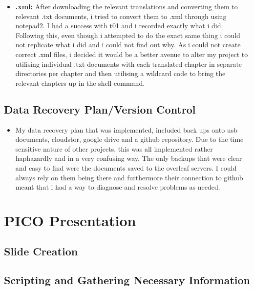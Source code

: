\documentclass{article}
\begin{document}
\begin{itemize}
    \item{\textbf{.xml:} After downloading the relevant translations and converting them to relevant .txt documents, i tried to convert them to .xml through using notepad2. I had a success with t01 and i recorded exactly what i did. Following this, even though i attempted to do the exact same thing i could not replicate what i did and i could not find out why. As i could not create correct .xml files, i decided it would be a better avenue to alter my project to utilising individual .txt documents with each translated chapter in separate directories per chapter and then utilising a wildcard code to bring the relevant chapters up in the shell command.}
    
   
\end{itemize}



\subsection{Data Recovery Plan/Version Control}

\begin{itemize}
\item{My data recovery plan that was implemented, included back ups onto usb documents, cloudstor, google drive and a github repository. Due to the time sensitive nature of other projects, this was all implemented rather haphazardly and in a very confusing way. The only backups that were clear and easy to find were the documents saved to the overleaf servers. I could always rely on them being there and furthermore their connection to github meant that i had a way to diagnose and resolve problems as needed. }
\end{itemize}

\section{PICO Presentation}

\subsection{Slide Creation}



\subsection{Scripting and Gathering Necessary Information}
\end{document}
